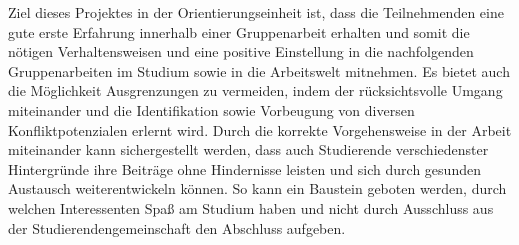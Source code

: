 \documentclass[a4paper]{article}
\begin{document}
Ziel dieses Projektes in der Orientierungseinheit ist, dass die Teilnehmenden eine gute erste Erfahrung innerhalb einer Gruppenarbeit erhalten und somit die nötigen Verhaltensweisen und eine positive Einstellung in die nachfolgenden Gruppenarbeiten im Studium sowie in die Arbeitswelt mitnehmen. Es bietet auch die Möglichkeit Ausgrenzungen zu vermeiden, indem der rücksichtsvolle Umgang miteinander und die Identifikation sowie Vorbeugung von diversen Konfliktpotenzialen erlernt wird. Durch die korrekte Vorgehensweise in der Arbeit miteinander kann sichergestellt werden, dass auch Studierende verschiedenster Hintergründe ihre Beiträge ohne Hindernisse leisten und sich durch gesunden Austausch weiterentwickeln können. So kann ein Baustein geboten werden, durch welchen Interessenten Spaß am Studium haben und nicht durch Ausschluss aus der Studierendengemeinschaft den Abschluss aufgeben.
\end{document}

